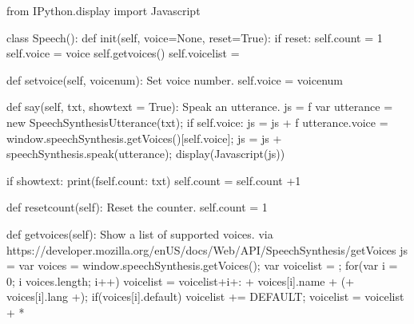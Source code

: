 \documentclass[letterpaper,10pt,english]{sphinxmanual}
\begin{document}
{
\begin{sphinxVerbatim}[commandchars=\\\{\}]
\llap{\color{nbsphinxin}[ ]:\,\hspace{\fboxrule}\hspace{\fboxsep}}from IPython.display import Javascript

class Speech():
    def \PYGZus{}\PYGZus{}init\PYGZus{}\PYGZus{}(self, voice=None, reset=True):
        if reset:
            self.count = 1
        self.voice = voice
        self.\PYGZus{}get\PYGZus{}voices()
        self.voicelist = \PYGZsq{}\PYGZsq{}

    def set\PYGZus{}voice(self, voicenum):
        \PYGZdq{}\PYGZdq{}\PYGZdq{}Set voice number.\PYGZdq{}\PYGZdq{}\PYGZdq{}
        self.voice = voicenum

    def say(self, txt, showtext = True):
        \PYGZdq{}\PYGZdq{}\PYGZdq{}Speak an utterance.\PYGZdq{}\PYGZdq{}\PYGZdq{}
        js = f\PYGZsq{}\PYGZsq{}\PYGZsq{}
        var utterance = new SpeechSynthesisUtterance(\PYGZdq{}\PYGZob{}txt\PYGZcb{}\PYGZdq{});
        \PYGZsq{}\PYGZsq{}\PYGZsq{}
        if self.voice:
            js = js + f\PYGZsq{}\PYGZsq{}\PYGZsq{}
            utterance.voice = window.speechSynthesis.getVoices()[\PYGZob{}self.voice\PYGZcb{}];
            \PYGZsq{}\PYGZsq{}\PYGZsq{}
        js = js + \PYGZsq{}speechSynthesis.speak(utterance);\PYGZsq{}
        display(Javascript(js))

        if showtext:
            print(f\PYGZsq{}\PYGZob{}self.count\PYGZcb{}: \PYGZob{}txt\PYGZcb{}\PYGZsq{})
        self.count = self.count +1

    def reset\PYGZus{}count(self):
        \PYGZdq{}\PYGZdq{}\PYGZdq{}Reset the counter.\PYGZdq{}\PYGZdq{}\PYGZdq{}
        self.count = 1

    def \PYGZus{}get\PYGZus{}voices(self):
        \PYGZdq{}\PYGZdq{}\PYGZdq{}Show a list of supported voices.\PYGZdq{}\PYGZdq{}\PYGZdq{}
        \PYGZsh{} via https://developer.mozilla.org/en\PYGZhy{}US/docs/Web/API/SpeechSynthesis/getVoices
        js = \PYGZsq{}\PYGZsq{}\PYGZsq{}
        var voices =  window.speechSynthesis.getVoices();
    var voicelist = \PYGZsq{}\PYGZsq{};
   for(var i = 0; i \PYGZlt{} voices.length; i++) \PYGZob{}
   voicelist = voicelist+i+\PYGZsq{}: \PYGZsq{}+ voices[i].name + \PYGZsq{} (\PYGZsq{}+ voices[i].lang +\PYGZsq{})\PYGZsq{};
    if(voices[i].default) \PYGZob{}
      voicelist += \PYGZsq{} \PYGZhy{}\PYGZhy{} DEFAULT\PYGZsq{};
    \PYGZcb{}
   voicelist = voicelist + \PYGZsq{}*\PYGZsq{}
  \PYGZcb{}


\end{sphinxVerbatim}}
\end{document}
